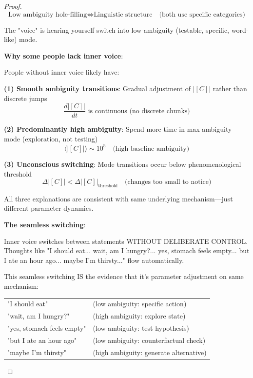 \documentclass[11pt,a4paper]{article}
\begin{document}
\begin{proof}
\begin{equation}
\text{Low ambiguity hole-filling} \iff \text{Linguistic structure} \quad \text{(both use specific categories)}
\end{equation}

The "voice" is hearing yourself switch into low-ambiguity (testable, specific, word-like) mode.

\textbf{Why some people lack inner voice}:

People without inner voice likely have:

\textbf{(1) Smooth ambiguity transitions}: Gradual adjustment of $|[C]|$ rather than discrete jumps
\begin{equation}
\frac{d|[C]|}{dt} \text{ is continuous (no discrete chunks)}
\end{equation}

\textbf{(2) Predominantly high ambiguity}: Spend more time in max-ambiguity mode (exploration, not testing)
\begin{equation}
\langle |[C]| \rangle \sim 10^{5} \quad \text{(high baseline ambiguity)}
\end{equation}

\textbf{(3) Unconscious switching}: Mode transitions occur below phenomenological threshold
\begin{equation}
\Delta |[C]| < \Delta |[C]|_{\text{threshold}} \quad \text{(changes too small to notice)}
\end{equation}

All three explanations are consistent with same underlying mechanism—just different parameter dynamics.

\textbf{The seamless switching}:

\begin{observation}
Inner voice switches between statements WITHOUT DELIBERATE CONTROL. Thoughts like "I should eat... wait, am I hungry?... yes, stomach feels empty... but I ate an hour ago... maybe I'm thirsty..." flow automatically.
\end{observation}

This seamless switching IS the evidence that it's parameter adjustment on same mechanism:

\begin{center}
\begin{tabular}{ll}
"I should eat" & (low ambiguity: specific action) \\
"wait, am I hungry?" & (high ambiguity: explore state) \\
"yes, stomach feels empty" & (low ambiguity: test hypothesis) \\
"but I ate an hour ago" & (low ambiguity: counterfactual check) \\
"maybe I'm thirsty" & (high ambiguity: generate alternative)
\end{tabular}
\end{center}


\end{proof}
\end{document}

